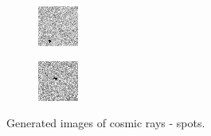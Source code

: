 \begin{figure}[!h]
\begin{subfigure}[t]{.23\textwidth}
    \end{subfigure}
    \begin{subfigure}[t]{.23\textwidth}
        \centering
        \includegraphics[width=\textwidth]{images/spotC.png}
    \end{subfigure}
    \begin{subfigure}[t]{.23\textwidth}
        \centering
        \includegraphics[width=\textwidth]{images/spotD.png}
    \end{subfigure}

    \caption{Generated images of cosmic rays - spots. }
    \label{fig:spotsPar}
\end{figure}

